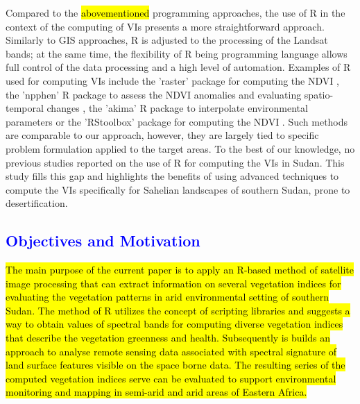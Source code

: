 \documentclass[jimaging,article,submit,pdftex,moreauthors]{Definitions/mdpi}
\begin{document}
Compared to the \hl{abovementioned }programming approaches, the use of R in the context of the computing of VIs presents a more straightforward approach. Similarly to GIS approaches, R is adjusted to the processing of the Landsat bands; at the same time, the flexibility of R being programming language allows full control of the data processing and a high level of automation. Examples of R used for computing VIs include the 'raster' package for computing the NDVI \cite{LEVEAU2021127199}, the 'npphen' R package to assess the NDVI anomalies and evaluating spatio-temporal changes \cite{CHAVEZ2023103138}, the 'akima' R package to interpolate environmental parameters \cite{KLIMAVICIUS2023171} or the 'RStoolbox' package for computing the NDVI \cite{PRAVALIE2022108629}. Such methods are comparable to our approach, however, they are largely tied to specific problem formulation applied to the target areas. To the best of our knowledge, no previous studies reported on the use of R for computing the VIs in Sudan. This study fills this gap and highlights the benefits of using advanced techniques to compute the VIs specifically for Sahelian landscapes of southern Sudan, prone to desertification.

\subsection{\textcolor{blue}{Objectives and Motivation}}

\hl{The main purpose of the current paper is to apply an R-based method of satellite image processing that can extract information on several vegetation indices for evaluating the vegetation patterns in arid environmental setting of southern Sudan. The method of R utilizes the concept of scripting libraries and suggests a way to obtain values of spectral bands for computing diverse vegetation indices that describe the vegetation greenness and health. Subsequently is builds an approach to analyse remote sensing data associated with spectral signature of land surface features visible on the space borne data. The resulting series of the computed vegetation indices serve can be evaluated to support environmental monitoring and mapping in semi-arid and arid areas of Eastern Africa.}
\end{document}

